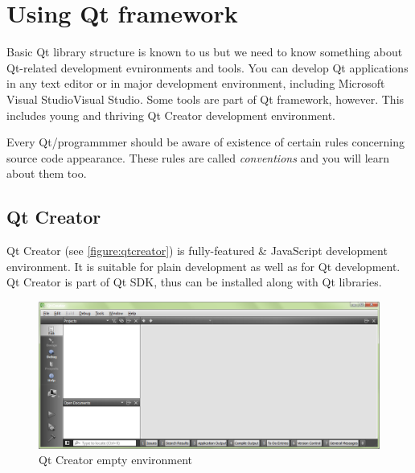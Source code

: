 \section{Using Qt framework}
Basic Qt library structure is known to us but we need to know something about Qt-related development evnironments and tools. You can develop Qt applications in any text editor or in major development environment, including Microsoft Visual Studio{Visual Studio}. Some tools are part of Qt framework, however. This includes young and thriving Qt Creator development environment.

Every Qt/\cpp programmmer should be aware of existence of certain rules concerning source code appearance. These rules are called \textit{conventions} and you will learn about them too.

\subsection{Qt Creator}
Qt Creator (see \autoref{figure:qtcreator}) is fully-featured \cpp \& JavaScript development environment. It is suitable for plain \cpp development as well as for Qt development. Qt Creator is part of Qt SDK, thus can be installed along with Qt libraries.

\begin{figure}[ht]
\centering
\includegraphics[width=14.5cm]{graphics/laboratory/03-qtcreator.png}
\caption{Qt Creator empty environment}\label{figure:qtcreator}
\end{figure}

